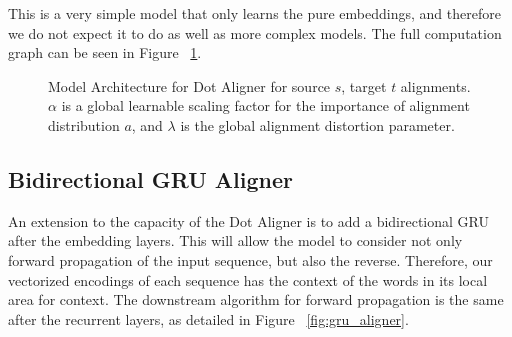 \documentclass[twoside,twocolumn]{article}
\begin{document}
This is a very simple model that only learns the pure embeddings, and therefore we do not expect it to do as well as more complex models. The full computation graph can be seen in Figure ~\ref{fig:dot_aligner}.

\begin{figure}
  \centering
  \caption{Model Architecture for Dot Aligner for source $s$, target $t$ alignments. $\alpha$ is a global learnable scaling factor for the importance of alignment distribution $a$, and $\lambda$ is the global alignment distortion parameter.}
  \label{fig:dot_aligner}
\end{figure}

\subsection{Bidirectional GRU Aligner}

An extension to the capacity of the Dot Aligner is to add a bidirectional GRU after the embedding layers. This will allow the model to consider not only forward propagation of the input sequence, but also the reverse. Therefore, our vectorized encodings of each sequence has the context of the words in its local area for context. The downstream algorithm for forward propagation is the same after the recurrent layers, as detailed in Figure ~\ref{fig:gru_aligner}.
\end{document}
